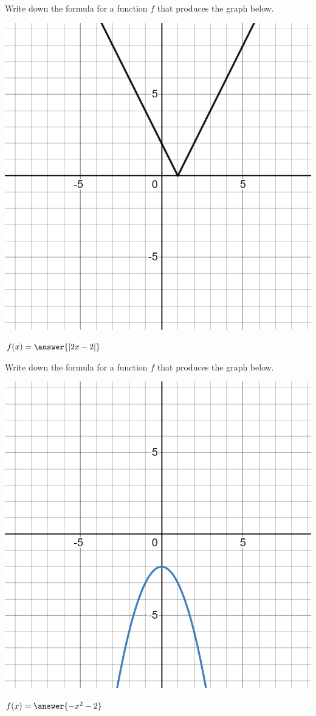 \documentclass{ximera}
\begin{document}
\begin{exercise}
Write down the formula for a function $f$ that produces the graph below. 

\includegraphics[width=1\linewidth]{FT25graph3.png}

$f(x) = \answer{|2x - 2|}$

\end{exercise}

\begin{exercise}
Write down the formula for a function $f$ that produces the graph below. 

\includegraphics[width=1\linewidth]{FT25graph4.png}

$f(x) = \answer{-x^2 - 2}$

\end{exercise}
\end{document}
